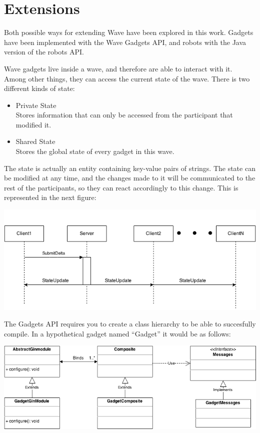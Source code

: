 \newpage
\section{Extensions}

Both possible ways for extending Wave have been explored in this work. Gadgets have been implemented with the Wave Gadgets API, and robots with the Java version of the robots API.

Wave gadgets live inside a wave, and therefore are able to interact with it. Among other things, they can access the current state of the wave. There is two different kinds of state:

\begin{itemize}
  \item Private State\\
        Stores information that can only be accessed from the participant that modified it.
  \item Shared State\\
        Stores the global state of every gadget in this wave.
\end{itemize}

The state is actually an entity containing key-value pairs of strings. The state can be modified at any time, and the changes made to it will be communicated to the rest of the participants, so they can react accordingly to this change. This is represented in the next figure:


\begin{center}
\includegraphics[keepaspectratio, scale=0.6]{Media/Diagrams/State/StateSequence.png}
\end{center}


The Gadgets API requires you to create a class hierarchy to be able to succesfully compile. In a hypothetical gadget named ``Gadget'' it would be as follows:

\begin{center}
\includegraphics[keepaspectratio, scale=0.5]{Media/Diagrams/Gadget/Gadget.png}
\end{center}

